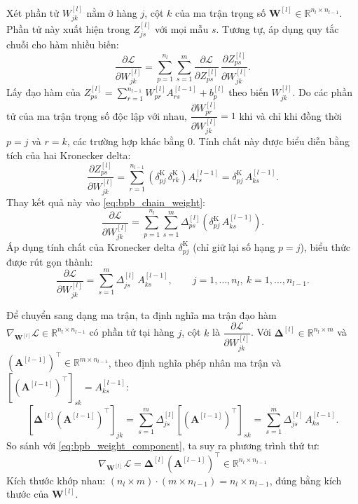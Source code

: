 Xét phần tử $W_{jk}^{[l]}$ nằm ở hàng $j$, cột $k$ của ma trận trọng số $\mathbf{W}^{[l]} \in \mathbb{R}^{n_l \times n_{l-1}}$. Phần tử này xuất hiện trong $Z_{js}^{[l]}$ với mọi mẫu $s$. Tương tự, áp dụng quy tắc chuỗi cho hàm nhiều biến:
\begin{equation}
\frac{\partial\mathcal{L}}{\partial W_{jk}^{[l]}} = \sum_{p=1}^{n_l}\sum_{s=1}^{m} \frac{\partial\mathcal{L}}{\partial Z_{ps}^{[l]}}\,\frac{\partial Z_{ps}^{[l]}}{\partial W_{jk}^{[l]}}.
\label{eq:bpb_chain_weight}
\end{equation}
Lấy đạo hàm của $Z_{ps}^{[l]} = \sum_{r=1}^{n_{l-1}} W_{pr}^{[l]}A_{rs}^{[l-1]} + b_p^{[l]}$ theo biến $W_{jk}^{[l]}$. Do các phần tử của ma trận trọng số độc lập với nhau, $\dfrac{\partial W_{pr}^{[l]}}{\partial W_{jk}^{[l]}} = 1$ khi và chỉ khi đồng thời $p = j$ và $r = k$, các trường hợp khác bằng $0$. Tính chất này được biểu diễn bằng tích của hai Kronecker delta:
\begin{equation}
\frac{\partial Z_{ps}^{[l]}}{\partial W_{jk}^{[l]}} = \sum_{r=1}^{n_{l-1}} \left(\delta^{\mathrm{K}}_{pj}\,\delta^{\mathrm{K}}_{rk}\right) A_{rs}^{[l-1]} = \delta^{\mathrm{K}}_{pj}\,A_{ks}^{[l-1]}.
\end{equation}
Thay kết quả này vào \eqref{eq:bpb_chain_weight}:
\begin{equation}
\frac{\partial\mathcal{L}}{\partial W_{jk}^{[l]}} = \sum_{p=1}^{n_l}\sum_{s=1}^{m} \Delta_{ps}^{[l]}\left(\delta^{\mathrm{K}}_{pj}\,A_{ks}^{[l-1]}\right).
\end{equation}
Áp dụng tính chất của Kronecker delta $\delta^{\mathrm{K}}_{pj}$ (chỉ giữ lại số hạng $p = j$), biểu thức được rút gọn thành:
\begin{equation}
\frac{\partial\mathcal{L}}{\partial W_{jk}^{[l]}} = \sum_{s=1}^{m}\Delta_{js}^{[l]}\,A_{ks}^{[l-1]}, \qquad j = 1,\dots,n_l,\ k = 1,\dots,n_{l-1}.
\label{eq:bpb_weight_component}
\end{equation}
 
Để chuyển sang dạng ma trận, ta định nghĩa ma trận đạo hàm $\nabla_{\mathbf{W}^{[l]}}\mathcal{L} \in \mathbb{R}^{n_l \times n_{l-1}}$ có phần tử tại hàng $j$, cột $k$ là $\dfrac{\partial\mathcal{L}}{\partial W_{jk}^{[l]}}$. Với $\boldsymbol{\Delta}^{[l]} \in \mathbb{R}^{n_l \times m}$ và $\left(\mathbf{A}^{[l-1]}\right)^{\top} \in \mathbb{R}^{m \times n_{l-1}}$, theo định nghĩa phép nhân ma trận và $\left[\left(\mathbf{A}^{[l-1]}\right)^{\top}\right]_{sk} = A_{ks}^{[l-1]}$:
\begin{equation}
\left[\boldsymbol{\Delta}^{[l]}\left(\mathbf{A}^{[l-1]}\right)^{\top}\right]_{jk} = \sum_{s=1}^{m}\Delta_{js}^{[l]}\left[\left(\mathbf{A}^{[l-1]}\right)^{\top}\right]_{sk} = \sum_{s=1}^{m}\Delta_{js}^{[l]}\,A_{ks}^{[l-1]}.
\end{equation}
So sánh với \eqref{eq:bpb_weight_component}, ta suy ra phương trình thứ tư:
\begin{equation}
\boxed{
\nabla_{\mathbf{W}^{[l]}}\mathcal{L} = \boldsymbol{\Delta}^{[l]}\left(\mathbf{A}^{[l-1]}\right)^{\top} \in \mathbb{R}^{n_l \times n_{l-1}}
}
\label{eq:bpb_weight_matrix}
\end{equation}
Kích thước khớp nhau: $(n_l \times m)\cdot(m \times n_{l-1}) = n_l \times n_{l-1}$, đúng bằng kích thước của $\mathbf{W}^{[l]}$.
 
